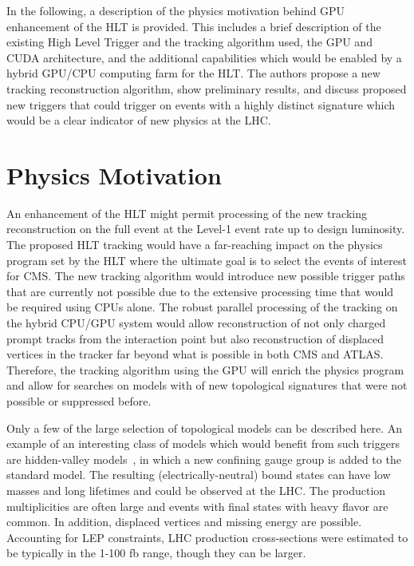 \documentclass{JINST}
\begin{document}
In the following, a description of the physics motivation behind GPU enhancement of the HLT is provided.
This includes a brief description of the existing High Level Trigger and the tracking algorithm used, 
the GPU and CUDA architecture, and the additional capabilities
which would be enabled by a hybrid GPU/CPU computing farm for the HLT. 
The authors propose a new tracking reconstruction algorithm, show preliminary results,
and discuss proposed new triggers that could trigger on events with a highly distinct signature which
would be a clear indicator of new physics at the LHC.


\section{Physics Motivation}

An enhancement of the HLT might permit processing of the new tracking reconstruction on the full event 
at the Level-1 event rate up to design luminosity. The proposed HLT tracking would have a far-reaching impact on the physics program 
set by the HLT where the ultimate goal is to select the events of interest for CMS.
The new tracking algorithm would introduce new possible trigger paths that are currently not possible due to the extensive
 processing time that would be required using CPUs alone. The robust parallel processing of the tracking on the 
hybrid CPU/GPU system would allow reconstruction of not only charged prompt tracks from the interaction point
but also reconstruction of displaced vertices in the tracker far beyond what is possible in both CMS and ATLAS.
Therefore, the tracking algorithm using the GPU will enrich the physics program and allow for searches on models with of new topological signatures that were not possible or suppressed before.

Only a few of the large selection of topological models can be described here. An example of an
interesting class of models which would benefit from such triggers are hidden-valley models~\cite{bib:hiddenvalley}, 
in which a new confining gauge group is added to the standard model. The resulting (electrically-neutral) bound states can have
 low masses and long lifetimes and could be observed at the LHC. The production multiplicities are often large and events with final states with heavy flavor are
common. In addition, displaced vertices and missing energy are possible. Accounting for LEP constraints, LHC production 
cross-sections were estimated to be typically in the 1-100 fb range, though they can be larger.
\end{document}
